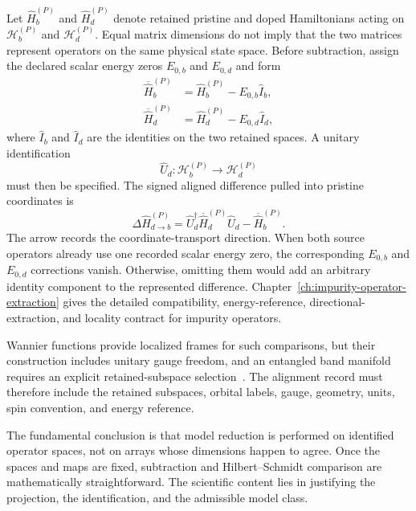 Let $\hat H_b^{(P)}$ and $\hat H_d^{(P)}$ denote retained pristine and doped
Hamiltonians acting on $\mathcal H_b^{(P)}$ and $\mathcal H_d^{(P)}$. Equal
matrix dimensions do not imply that the two matrices represent operators on
the same physical state space. Before subtraction, assign the declared scalar
energy zeros $E_{0,b}$ and $E_{0,d}$ and form
\begin{align}
    \overline{\hat H}_b^{(P)}
    &=
    \hat H_b^{(P)}-E_{0,b}\hat I_b,
    \\
    \overline{\hat H}_d^{(P)}
    &=
    \hat H_d^{(P)}-E_{0,d}\hat I_d,
\end{align}
where $\hat I_b$ and $\hat I_d$ are the identities on the two retained spaces.
A unitary identification
\begin{equation}
    \hat U_d:
    \mathcal H_b^{(P)}
    \longrightarrow
    \mathcal H_d^{(P)}
\end{equation}
must then be specified. The signed aligned difference pulled into pristine
coordinates is
\begin{equation}
    \Delta\hat H_{d\to b}^{(P)}
    =
    \hat U_d^\dagger
    \overline{\hat H}_d^{(P)}
    \hat U_d
    -
    \overline{\hat H}_b^{(P)}.
\end{equation}
The arrow records the coordinate-transport direction. When both source
operators already use one recorded scalar energy zero, the corresponding
$E_{0,b}$ and $E_{0,d}$ corrections vanish. Otherwise, omitting them would add
an arbitrary identity component to the represented difference.
Chapter~\ref{ch:impurity-operator-extraction} gives the detailed compatibility,
energy-reference, directional-extraction, and locality contract for impurity
operators.

Wannier functions provide localized frames for such comparisons, but their
construction includes unitary gauge freedom, and an entangled band manifold
requires an explicit retained-subspace selection~\cite{marzari2012,souza2001}.
The alignment record must therefore include the retained subspaces, orbital
labels, gauge, geometry, units, spin convention, and energy reference.

The fundamental conclusion is that model reduction is performed on identified
operator spaces, not on arrays whose dimensions happen to agree. Once the
spaces and maps are fixed, subtraction and Hilbert--Schmidt comparison are
mathematically straightforward. The scientific content lies in justifying the
projection, the identification, and the admissible model class.
